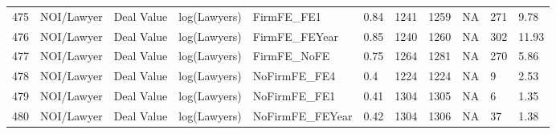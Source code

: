 \documentclass{article}
\begin{document}
\begin{table}[H]
\begin{tabular}{rllllllllll}
  475 & NOI/Lawyer & Deal Value & log(Lawyers) & FirmFE\_FE1 & 0.84 & 1241 & 1259 & NA & 271 & 9.78 \\ 
  476 & NOI/Lawyer & Deal Value & log(Lawyers) & FirmFE\_FEYear & 0.85 & 1240 & 1260 & NA & 302 & 11.93 \\ 
  477 & NOI/Lawyer & Deal Value & log(Lawyers) & FirmFE\_NoFE & 0.75 & 1264 & 1281 & NA & 270 & 5.86 \\ 
  478 & NOI/Lawyer & Deal Value & log(Lawyers) & NoFirmFE\_FE4 & 0.4 & 1224 & 1224 & NA & 9 & 2.53 \\ 
  479 & NOI/Lawyer & Deal Value & log(Lawyers) & NoFirmFE\_FE1 & 0.41 & 1304 & 1305 & NA & 6 & 1.35 \\ 
  480 & NOI/Lawyer & Deal Value & log(Lawyers) & NoFirmFE\_FEYear & 0.42 & 1304 & 1306 & NA & 37 & 1.38 \\ 
   \hline
\end{tabular}
\end{table}
\end{document}
